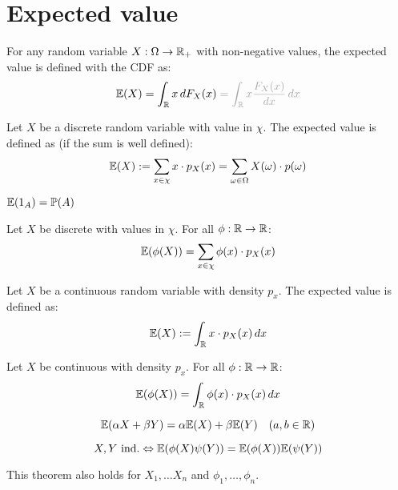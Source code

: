 \section{Expected value}

For any random variable \(X: \Omega \to \mathbb{R}_+\) with non-negative values, the expected value is defined with the CDF as:
\vspace{-8pt}
\[\E(X) = \int_\R x \,dF_X(x) \color{gray!70} = \int_\R x \frac{F_X(x)}{dx} \, dx\]

\begin{ddefinition*}
  Let \(X\) be a discrete random variable with value in \(\chi\). The expected value is defined as (if the sum is well defined):
  \[\mathbb{E}(X) := \sum_{x \in \chi}x \cdot p_X(x) = \sum_{\omega \in \Omega} X(\omega) \cdot p(\omega)\]
\end{ddefinition*}

\begin{proposition}
  {\small \(\mathbb{E}(1_A) = \mathbb{P}(A)\)}
\end{proposition}

\begin{dtheorem*}
  Let \(X\) be discrete with values in \(\chi\). For all \(\phi: \mathbb{R} \to \mathbb{R}\):
  \[\mathbb{E}(\phi(X)) = \sum_{x \in \chi}\phi(x) \cdot p_X(x)\]
\end{dtheorem*}

\begin{cdefinition*}
  Let \(X\) be a continuous random variable with density \(p_x\). The expected value is defined as:
  \[\mathbb{E}(X) := \int_{\mathbb{R}} x \cdot p_X(x) \,dx\]
\end{cdefinition*}

\begin{ctheorem*}
  Let \(X\) be continuous with density \(p_x\). For all \(\phi: \mathbb{R} \to \mathbb{R}\):
  \[\mathbb{E}(\phi(X)) = \int_{\mathbb{R}} \phi(x) \cdot p_X(x) \, dx\]
\end{ctheorem*}

\begin{theorem*}
  \[\mathbb{E}(\alpha X + \beta Y) = \alpha \mathbb{E}(X) + \beta \mathbb{E}(Y) \quad (a, b \in \mathbb{R})\]
\end{theorem*}

\begin{theorem*}
  \[X, Y \ \text{ind.} \Leftrightarrow \mathbb{E}(\phi(X) \psi(Y)) = \mathbb{E}(\phi(X)) \mathbb{E}(\psi(Y))\]
\end{theorem*}
This theorem also holds for \(X_1, \ldots X_n\) and \(\phi_1, \ldots, \phi_n\).

